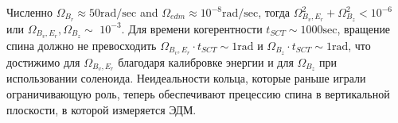 \begin{frame}
	Численно $\Omega_{B_r} \approx 50 \mathrm{rad} / \mathrm{sec}$ and $\Omega_{e d m} \approx 10^{-8} \mathrm{rad} / \mathrm{sec}$, тогда $\Omega_{B_v, E_r}^2+\Omega_{B_z}^2<10^{-6}$ или $\Omega_{B_v, E_r}, \Omega_{B_z} \sim$ $10^{-3}$. Для времени когерентности $t_{S C T} \sim 1000 \mathrm{sec}$, вращение спина должно не превосходить $\Omega_{B_v, E_r} \cdot t_{S C T} \sim 1 \mathrm{rad}$ и $\Omega_{B_z} \cdot t_{S C T} \sim 1 \mathrm{rad}$, что достижимо для $\Omega_{B_v, E_r}$ благодаря калибровке энергии и для $\Omega_{B_z}$ при использовании соленоида.
	\newline
	\newline
	Неидеальности кольца, которые раньше играли ограничивающую роль, теперь обеспечивают прецессию спина в вертикальной плоскости, в которой измеряется ЭДМ.
\end{frame}